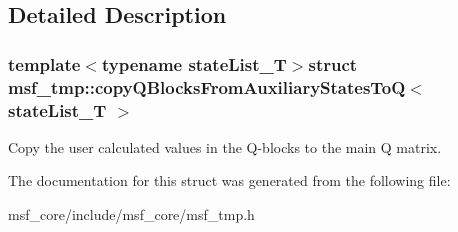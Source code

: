\subsection{Detailed Description}
\subsubsection*{template$<$typename state\-List\-\_\-\-T$>$struct msf\-\_\-tmp\-::copy\-Q\-Blocks\-From\-Auxiliary\-States\-To\-Q$<$ state\-List\-\_\-\-T $>$}

Copy the user calculated values in the Q-\/blocks to the main Q matrix. 

The documentation for this struct was generated from the following file\-:\begin{DoxyCompactItemize}
\item 
msf\-\_\-core/include/msf\-\_\-core/msf\-\_\-tmp.\-h\end{DoxyCompactItemize}
